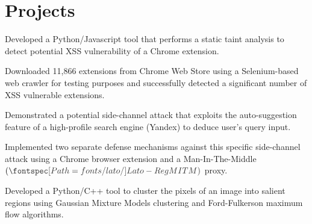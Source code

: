 \documentclass[]{deedy_format_Hien}
\begin{document}
\begin{minipage}[t]{0.66\textwidth}
\section{Projects}
\justify
\begin{tightemize}
\item Developed a Python/Javascript tool that performs a static taint analysis to detect potential XSS vulnerability of a Chrome extension. 
\item Downloaded 11,866 extensions from Chrome Web Store using a Selenium-based web crawler for testing purposes and successfully detected a significant number of XSS vulnerable extensions.  
\end{tightemize}
\vspace{\topsep}
\sectionsep


\justify
\begin{tightemize}
\item Demonstrated a potential side-channel attack that exploits the auto-suggestion feature of a high-profile search engine (Yandex) to deduce user's query input. 
\item Implemented two separate defense mechanisms against this specific side-channel attack using a Chrome browser extension and a Man-In-The-Middle $(\custombold{MITM})$ proxy. 
\end{tightemize}
\vspace{\topsep}
\sectionsep


\justify
\begin{tightemize}
\item Developed a Python/C++ tool to cluster the pixels of an image into salient regions using Gaussian Mixture Models clustering and Ford-Fulkerson maximum flow algorithms.
\end{tightemize}
\vspace{\topsep}
\sectionsep
%
%
\end{minipage} 
\end{document}
